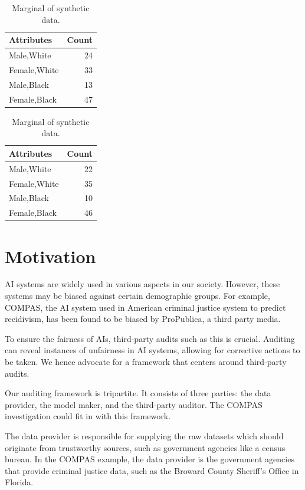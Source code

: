 \documentclass[manuscript,screen,review,anonymous]{acmart}
\begin{document}
\begin{table}[h]
\caption{Example marginals.}
\label{tab:marginal-example}
\centering
\begin{subtable}[t]{0.45\linewidth}
\centering
\caption{Marginal of original data.}
\begin{tabular}{lr}
\toprule
Attributes & Count \\
\midrule
Male,White & 24 \\
Female,White & 33 \\
Male,Black & 13 \\
Female,Black & 47 \\
\bottomrule
\end{tabular}
\end{subtable}
\begin{subtable}[t]{0.45\linewidth}
\centering
\caption{Marginal of synthetic data.}
\begin{tabular}{lr}
\toprule
Attributes & Count \\
\midrule
Male,White & 22 \\
Female,White & 35 \\
Male,Black & 10 \\
Female,Black & 46 \\
\bottomrule
\end{tabular}
\end{subtable}
\end{table}

\section{Motivation}

AI systems are widely used in various aspects in our society. However, these systems may be biased against certain demographic groups. For example, COMPAS, the AI system used in American criminal justice system to predict recidivism, has been found to be biased by ProPublica, a third party media.

To ensure the fairness of AIs, third-party audits such as this is crucial. Auditing can reveal instances of unfairness in AI systems, allowing for corrective actions to be taken. We hence advocate for a framework that centers around third-party audits.

Our auditing framework is tripartite. It consists of three parties: the data provider, the model maker, and the third-party auditor. The COMPAS investigation could fit in with this framework.

The data provider is responsible for supplying the raw datasets which should originate from trustworthy sources, such as government agencies like a census bureau. In the COMPAS example, the data provider is the government agencies that provide criminal justice data, such as the Broward County Sheriff's Office in Florida.
\end{document}
